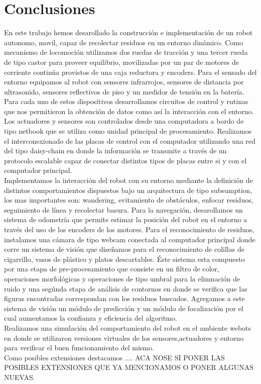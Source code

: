 
\section{Conclusiones}
En este trabajo hemos desarollado la construcci\'on e implementaci\'on
de un robot autonomo, movil, capaz de recolectar residuos en un entorno din\'amico. 
Como mecanismo de locomoci\'on utilizamos dos ruedas de tracci\'on y una 
tercer rueda de tipo castor para proveer equilibrio, movilizadas por un 
par de motores de corriente contin\'ua provistos de una caja reductora y encoders. 
Para el sensado del entorno equipamos al robot con sensores 
infrarrojos, sensores de distancia por ultrasonido, sensores reflectivos 
de piso y un medidor de tensi\'on en la bater\'ia. Para cada uno de estos 
dispositivos desarrollamos circuitos de control y rutinas que nos permitieron 
la obtenci\'on de datos como as\'i la interacci\'on con el entorno. 
Los actuadores y sensores son controlados desde una computadora a bordo de tipo
netbook que se utiliza como unidad principal de procesamiento. 
Realizamos el interconexionado de las placas de control con el computador
utilizando una red del tipo daisy-chain en donde la informaci\'on se transmite 
a trav\'es de un protocolo escalable capaz de conectar distintos tipos de 
placas entre si y con el computador principal.\\
\indent  Implementamos la interacci\'on del 
robot con su entorno mediante la definici\'on de distintos comportamientos dispuestos 
bajo un arquitectura de tipo subsumption, los mas importantes son: 
wandering, evitamiento de obst\'aculos, enfocar residuos, seguimiento de 
l\'inea y recolectar basura. Para la navegaci\'on, desarollamos
un sistema de odometr\'ia que permite estimar la posici\'on del robot en 
el entorno a trav\'es del uso de los encoders de los motores.
Para el reconocimiento de residuos, instalamos una c\'amara de tipo webcam 
conectada al computador principal donde corre un sistema de visi\'on que 
diseñamos para el reconocimiento de colillas de cigarrillo, vasos de pl\'astico 
y platos descartables. \'Este sistema esta compuesto por una etapa de 
pre-procesamiento que consiste en un filtro de color, operaciones morfol\'ogicas 
y operaciones de tipo umbral para la elimnaci\'on de ruido y una seg\'unda 
etapa de an\'alisis de contornos en donde se verifica que las figuras encontradas 
correspondan con los residuos buscados. Agregamos a este sistema de 
visi\'on un m\'odulo de predicci\'on y un m\'odulo de focalizaci\'on por 
el cual  aumentamos la confianza y eficiencia del algoritmo. \\ 
\indent Realizamos una simulaci\'on del comportamiento del robot en el 
ambiente webots en 
donde se utilizaron versiones virtuales de los sensores,actuadores y entorno 
para verificar el buen funcionamiento del mismo. \\
\indent Como posibles extensiones destacamos .... 
ACA NOSE SI PONER LAS POSIBLES EXTENSIONES QUE YA MENCIONAMOS O PONER ALGUNAS NUEVAS.
\label{conc}
